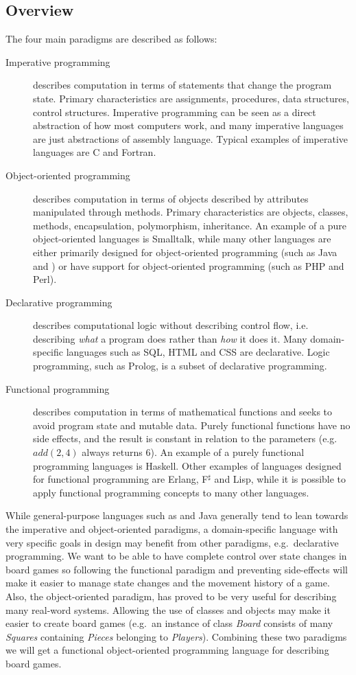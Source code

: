 \subsection{Overview}
The four main paradigms are described as follows\cite{fourparadigms}: 
\begin{description}
\item[Imperative programming] describes computation in terms of statements that
  change the program state. Primary characteristics are assignments, procedures,
  data structures, control structures. Imperative programming can be seen as a
  direct abstraction of how most computers work, and many imperative languages
  are just abstractions of assembly language. Typical examples of imperative
  languages are C and Fortran.
\item[Object-oriented programming] describes computation in terms of objects
  described by attributes manipulated through methods. Primary characteristics
  are objects, classes, methods, encapsulation, polymorphism, inheritance. An
  example of a pure object-oriented languages is Smalltalk, while many other
  languages are either primarily designed for object-oriented programming (such
  as Java and \CS{}) or have support for object-oriented programming (such as PHP
  and Perl).
\item[Declarative programming] describes computational logic without describing
  control flow, i.e. describing {\em what} a program does rather than {\em how}
  it does it. Many domain-specific languages such as SQL, HTML and CSS are
  declarative. Logic programming, such as Prolog, is a subset of declarative
  programming.
\item[Functional programming] describes computation in terms of mathematical
  functions and seeks to avoid program state and mutable data. Purely functional
  functions have no side effects, and the result is constant in relation to the
  parameters (e.g. $add(2, 4)$ always returns $6$). An example of a purely
  functional programming languages is Haskell. Other examples of languages
  designed for functional programming are Erlang, F$^\sharp$ and Lisp, while it is
  possible to apply functional programming concepts to many other languages.
\end{description}


While general-purpose languages such as \CS{} and Java generally tend to lean
towards the imperative and object-oriented paradigms, a domain-specific
language with very specific goals in design may benefit from other paradigms,
e.g.\ declarative programming. We want to be able to have complete control
over state changes in board games so following the functional paradigm
and preventing side-effects will make it easier to manage state changes
and the movement history of a game. Also, the object-oriented paradigm,
has proved to be very useful for describing many real-word systems. Allowing
the use of classes and objects may make it easier to create board games
(e.g.\ an instance of class \emph{Board} consists of many \emph{Squares} 
containing \emph{Pieces} belonging to \emph{Players}). Combining these two
paradigms we will get a functional object-oriented programming language
for describing board games.

